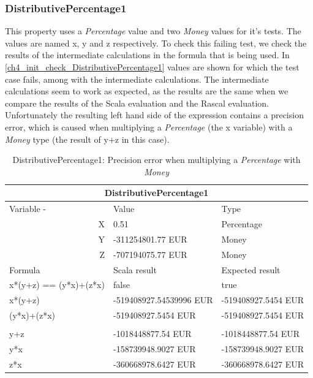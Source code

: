 \subsubsection{DistributivePercentage1}
\label{ssct:ch5_distributivePercentage1}
This property uses a \textit{Percentage} value and two \textit{Money} values for it's tests. The values are named x, y and z respectively. To check this failing test, we check the results of the intermediate calculations in the formula that is being used. In \autoref{ch4_init_check_DistributivePercentage1} values are shown for which the test case fails, among with the intermediate calculations. The intermediate calculations seem to work as expected, as the results are the same when we compare the results of the Scala evaluation and the Rascal evaluation. Unfortunately the resulting left hand side of the expression contains a precision error, which is caused when multiplying a \textit{Percentage} (the x variable) with a \textit{Money} type (the result of y+z in this case).
\FloatBarrier
\begin{table}[h!]
\centering
\begin{tabular}{|lll|}
\hline
\multicolumn{3}{|c|}{DistributivePercentage1}                          \\ \hline
Variable   -            & Value                   & Type                \\
\multicolumn{1}{|r}{X} & 0.51                    & Percentage          \\
\multicolumn{1}{|r}{Y} & -311254801.77 EUR       & Money               \\
\multicolumn{1}{|r}{Z} & -707194075.77 EUR       & Money               \\ \hline
Formula                & Scala result            & Expected result     \\
x*(y+z) == (y*x)+(z*x) & false                   & true                \\
x*(y+z)                & -519408927.54539996 EUR & -519408927.5454 EUR \\
(y*x)+(z*x)            & -519408927.5454 EUR     & -519408927.5454 EUR \\
                       &                         &                     \\
y+z                    & -1018448877.54 EUR      & -1018448877.54 EUR  \\
y*x                    & -158739948.9027 EUR     & -158739948.9027 EUR \\
z*x                    & -360668978.6427 EUR     & -360668978.6427 EUR \\ \hline
\end{tabular}
\caption{DistributivePercentage1: Precision error when multiplying a \textit{Percentage} with \textit{Money}}
\label{ch4_init_check_DistributivePercentage1}
\end{table}
\FloatBarrier

